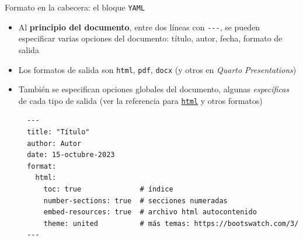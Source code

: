 \documentclass[
  10pt,
  ignorenonframetext,
]{beamer}
\providecommand{\tightlist}{%
  \setlength{\itemsep}{0pt}\setlength{\parskip}{0pt}}\usepackage{longtable,booktabs,array}
\begin{document}
\begin{frame}[fragile]{Formato en la cabecera: el bloque \texttt{YAML}}
\label{formato-en-la-cabecera-el-bloque-yaml}
\begin{itemize}
\tightlist
\item
  Al \textbf{principio del documento}, entre dos líneas con
  \texttt{-\/-\/-}, se pueden especificar varias opciones del documento:
  título, autor, fecha, formato de salida
\end{itemize}

\begin{itemize}
\item
  Los formatos de salida son \texttt{html}, \texttt{pdf}, \texttt{docx}
  (y otros en \emph{Quarto Presentations})
\item
  También se especifican opciones globales del documento, algunas
  \emph{específicas} de cada tipo de salida (ver la referencia para
  \href{https://quarto.org/docs/reference/formats/html.html}{\texttt{html}}
  y otros formatos)

\begin{verbatim}
  ---
  title: "Título"
  author: Autor 
  date: 15-octubre-2023
  format:
    html:
      toc: true              # índice
      number-sections: true  # secciones numeradas
      embed-resources: true  # archivo html autocontenido
      theme: united          # más temas: https://bootswatch.com/3/
  ---
\end{verbatim}
\end{itemize}
\end{frame}
\end{document}
